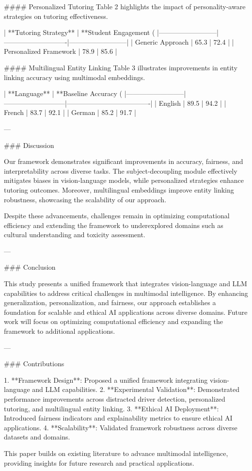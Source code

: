 #### Personalized Tutoring  
Table 2 highlights the impact of personality-aware strategies on tutoring effectiveness.

| **Tutoring Strategy**    | **Student Engagement (%
|--------------------------|----------------------------|--------------------------|
| Generic Approach         | 65.3                       | 72.4                     |
| Personalized Framework   | 78.9                       | 85.6                     |

#### Multilingual Entity Linking  
Table 3 illustrates improvements in entity linking accuracy using multimodal embeddings.

| **Language**             | **Baseline Accuracy (%
|--------------------------|---------------------------|-------------------------------------|
| English                  | 89.5                      | 94.2                                |
| French                   | 83.7                      | 92.1                                |
| German                   | 85.2                      | 91.7                                |

---

### Discussion  

Our framework demonstrates significant improvements in accuracy, fairness, and interpretability across diverse tasks. The subject-decoupling module effectively mitigates biases in vision-language models, while personalized strategies enhance tutoring outcomes. Moreover, multilingual embeddings improve entity linking robustness, showcasing the scalability of our approach.

Despite these advancements, challenges remain in optimizing computational efficiency and extending the framework to underexplored domains such as cultural understanding and toxicity assessment.

---

### Conclusion  

This study presents a unified framework that integrates vision-language and LLM capabilities to address critical challenges in multimodal intelligence. By enhancing generalization, personalization, and fairness, our approach establishes a foundation for scalable and ethical AI applications across diverse domains. Future work will focus on optimizing computational efficiency and expanding the framework to additional applications.

---

### Contributions  

1. **Framework Design**: Proposed a unified framework integrating vision-language and LLM capabilities.  
2. **Experimental Validation**: Demonstrated performance improvements across distracted driver detection, personalized tutoring, and multilingual entity linking.  
3. **Ethical AI Deployment**: Introduced fairness indicators and explainability metrics to ensure ethical AI applications.  
4. **Scalability**: Validated framework robustness across diverse datasets and domains.  

This paper builds on existing literature to advance multimodal intelligence, providing insights for future research and practical applications.